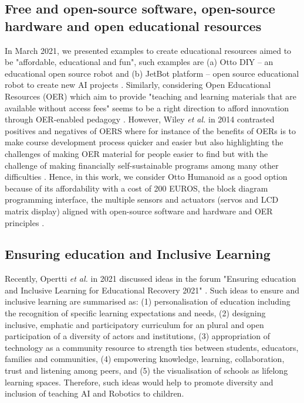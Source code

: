 \documentclass[conference]{IEEEtran}
\newcommand{\etal}{\textit{et al. }} %
\begin{document}
\subsection{Free and open-source software, open-source hardware and open educational resources}
In March 2021, we presented examples to create educational resources aimed to be "affordable, educational and fun", such examples are (a) Otto DIY -- an educational open source robot and (b) JetBot platform -- open source educational robot to create new AI projects \cite{montenegro2021air4children}.
Similarly, considering Open Educational Resources (OER) which aim to provide "teaching and learning materials that are available without access fees" seems to be a right direction to afford innovation through OER-enabled pedagogy \cite{Clinton-Lisell2021}.
However, Wiley \etal in 2014 contrasted positives and negatives of OERS where for instance of the benefits of OERs is to make course development process quicker and easier but also highlighting the challenges of making OER material for people easier to find but with the challenge of making financially self-sustainable programs among many other difficulties \cite{Wiley2014}.
Hence, in this work, we consider Otto Humanoid as a good option because of its affordability with a cost of 200 EUROS, the block diagram programming interface, the multiple sensors and actuators (servos and LCD matrix display) aligned with open-source software and hardware and OER principles \cite{OttoDIY:2016}.

\subsection{Ensuring education and Inclusive Learning}
Recently, Opertti \etal in 2021 discussed ideas in the forum "Ensuring education and Inclusive Learning for Educational Recovery 2021" \cite{opertti2021-unesco}.
Such ideas to ensure and inclusive learning are summarised as:
(1) personalisation of education including the recognition of specific learning expectations and needs,
(2) designing inclusive, emphatic and participatory curriculum for an plural and open participation of a diversity of actors and institutions,  
(3) appropriation of technology as a community resource to strength ties between students, educators, families and communities,  
(4) empowering knowledge, learning, collaboration, trust and listening among peers, and
(5) the visualisation of schools as lifelong learning spaces.
Therefore, such ideas would help to promote diversity and inclusion of teaching AI and Robotics to children.
\end{document}
